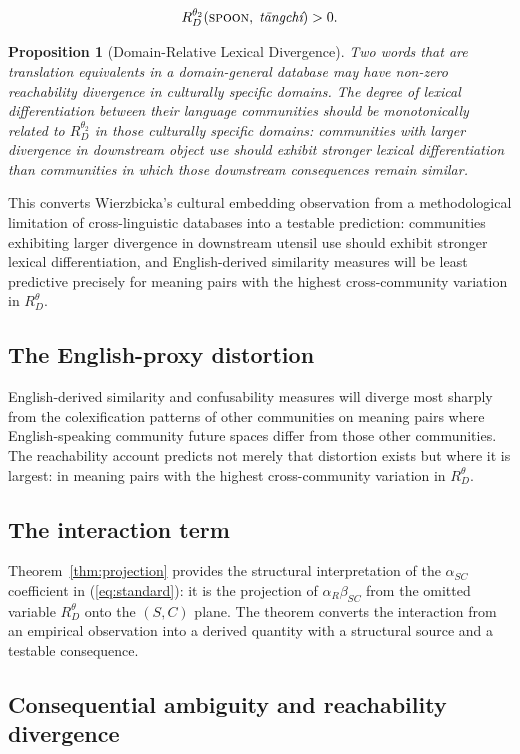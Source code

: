\documentclass[12pt]{article}
\theoremstyle{rthm}
\newtheorem{proposition}[theorem]{Proposition}
\theoremstyle{rdef}
\theoremstyle{remark}
\newcommand{\RD}[1][\theta]{R_{D}^{#1}}
\begin{document}
\[
\RD[\theta_2](\textsc{spoon},\; \textit{t\={a}ngch\'{i}}) > 0.
\]

\begin{proposition}[Domain-Relative Lexical Divergence]
\label{prop:cultural}
Two words that are translation equivalents in a domain-general database may have
non-zero reachability divergence in culturally specific domains. The degree of
lexical differentiation between their language communities should be monotonically
related to $\RD[\theta_2]$ in those culturally specific domains: communities
with larger divergence in downstream object use should exhibit stronger lexical
differentiation than communities in which those downstream consequences remain
similar.
\end{proposition}

This converts Wierzbicka's cultural embedding observation from a methodological
limitation of cross-linguistic databases into a testable prediction: communities
exhibiting larger divergence in downstream utensil use should exhibit stronger
lexical differentiation, and English-derived similarity measures will be least
predictive precisely for meaning pairs with the highest cross-community variation
in $\RD$.

\subsection{The English-proxy distortion}

English-derived similarity and confusability measures will diverge most sharply
from the colexification patterns of other communities on meaning pairs where
English-speaking community future spaces differ from those other communities.
The reachability account predicts not merely that distortion exists but where
it is largest: in meaning pairs with the highest cross-community variation in
$\RD$.

\subsection{The interaction term}

Theorem~\ref{thm:projection} provides the structural interpretation of the
$\alpha_{SC}$ coefficient in (\ref{eq:standard}): it is the projection of
$\alpha_R \beta_{SC}$ from the omitted variable $\RD$ onto the $(S,C)$ plane.
The theorem converts the interaction from an empirical observation into a
derived quantity with a structural source and a testable consequence.

\subsection{Consequential ambiguity and reachability divergence}
\end{document}
